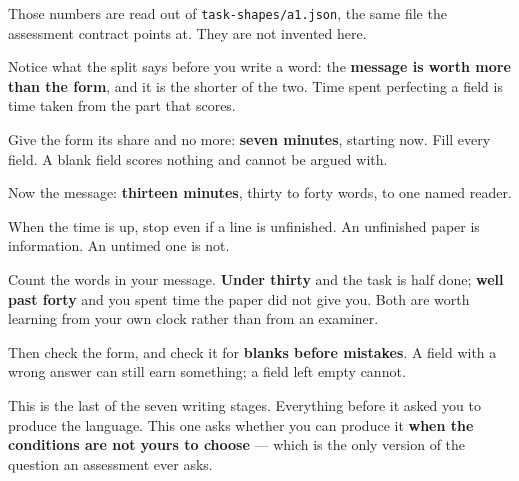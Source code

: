 Those numbers are read out of \texttt{task-shapes/a1.json}, the same file the assessment contract points at. They are not invented here.

Notice what the split says before you write a word: the \textbf{message is worth more than the form}, and it is the shorter of the two. Time spent perfecting a field is time taken from the part that scores.

Give the form its share and no more: \textbf{seven minutes}, starting now. Fill every field. A blank field scores nothing and cannot be argued with.

Now the message: \textbf{thirteen minutes}, thirty to forty words, to one named reader.

When the time is up, stop even if a line is unfinished. An unfinished paper is information. An untimed one is not.

\begin{tcolorbox}[breakable,colback=teal!4,colframe=teal!35!black,title={Before you move on}]
Count the words in your message. \textbf{Under thirty} and the task is half done; \textbf{well past forty} and you spent time the paper did not give you. Both are worth learning from your own clock rather than from an examiner.

Then check the form, and check it for \textbf{blanks before mistakes}. A field with a wrong answer can still earn something; a field left empty cannot.

This is the last of the seven writing stages. Everything before it asked you to produce the language. This one asks whether you can produce it \textbf{when the conditions are not yours to choose} — which is the only version of the question an assessment ever asks.
\end{tcolorbox}

